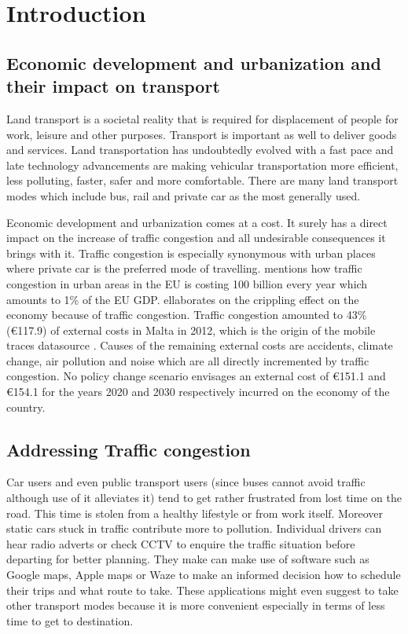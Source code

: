 \documentclass[12pt, a4paper]{report}
\theoremstyle{definition}
\theoremstyle{definition}%
\theoremstyle{definition}%
\theoremstyle{definition}%
\theoremstyle{definition}%
\theoremstyle{definition}%
\begin{document}
\chapter{Introduction}

\section{Economic development and urbanization and their impact on transport}

Land transport is a societal reality that is required for displacement of people for work, 
leisure and other purposes. Transport is important as well to deliver goods and services. Land transportation has undoubtedly evolved with a fast pace and late technology advancements are making vehicular transportation more efficient, less polluting, faster, safer and more comfortable. There are many land transport modes which include bus, rail and private car as the most generally used.

Economic development and urbanization comes at a cost. It surely has a direct impact on the increase of traffic congestion and all undesirable consequences it brings with it. Traffic congestion is especially synonymous with urban places where private car is the preferred mode of travelling. \cite{EUTransportDirectorate2018} mentions how traffic congestion in urban areas in the EU is costing 100 billion every year which amounts to 1\% of the EU GDP. \cite{Colak2015} ellaborates on the crippling effect on the economy because of traffic congestion. Traffic congestion amounted to 43\% (€117.9) of external costs in Malta in 2012, which is the origin of the mobile traces datasource \cite{Attard2015}. Causes of the remaining external costs are accidents, climate change, air pollution and noise which are all directly incremented by traffic congestion. No policy change scenario envisages an external cost of €151.1 and €154.1 for the years 2020 and 2030 respectively incurred on the economy of the country.

\section{Addressing Traffic congestion}

Car users and even public transport users (since buses cannot avoid traffic although use of it alleviates it) tend to get rather frustrated from lost time on the road. This time is stolen from a healthy lifestyle or from work itself. Moreover static cars stuck in traffic contribute more to pollution. Individual drivers can hear radio adverts or check CCTV to enquire the traffic situation before departing for better planning. They make can make use of software such as Google maps, Apple maps or Waze to make an informed decision how to schedule their trips and what route to take.  These applications might even suggest to take other transport modes because it is more convenient especially in terms of less time to get to destination. 
\end{document}
